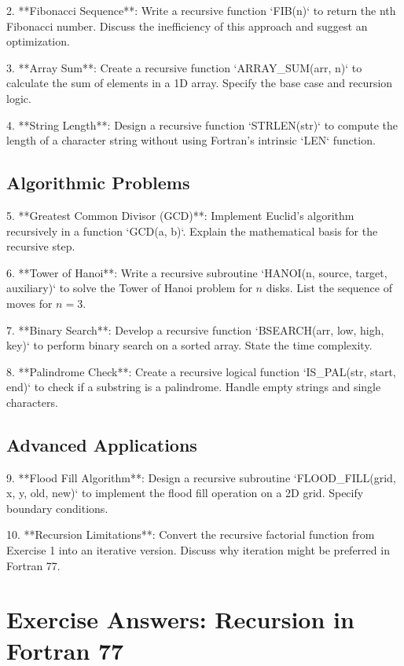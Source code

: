 \documentclass{book}
\begin{document}
2. **Fibonacci Sequence**:  
   Write a recursive function `FIB(n)` to return the nth Fibonacci number. Discuss the inefficiency of this approach and suggest an optimization.  

3. **Array Sum**:  
   Create a recursive function `ARRAY_SUM(arr, n)` to calculate the sum of elements in a 1D array. Specify the base case and recursion logic.  

4. **String Length**:  
   Design a recursive function `STRLEN(str)` to compute the length of a character string without using Fortran's intrinsic `LEN` function.  

\subsection*{Algorithmic Problems}  
5. **Greatest Common Divisor (GCD)**:  
   Implement Euclid's algorithm recursively in a function `GCD(a, b)`. Explain the mathematical basis for the recursive step.  

6. **Tower of Hanoi**:  
   Write a recursive subroutine `HANOI(n, source, target, auxiliary)` to solve the Tower of Hanoi problem for \( n \) disks. List the sequence of moves for \( n=3 \).  

7. **Binary Search**:  
   Develop a recursive function `BSEARCH(arr, low, high, key)` to perform binary search on a sorted array. State the time complexity.  

8. **Palindrome Check**:  
   Create a recursive logical function `IS_PAL(str, start, end)` to check if a substring is a palindrome. Handle empty strings and single characters.  

\subsection*{Advanced Applications}  
9. **Flood Fill Algorithm**:  
   Design a recursive subroutine `FLOOD_FILL(grid, x, y, old, new)` to implement the flood fill operation on a 2D grid. Specify boundary conditions.  

10. **Recursion Limitations**:  
    Convert the recursive factorial function from Exercise 1 into an iterative version. Discuss why iteration might be preferred in Fortran 77.  

\section{Exercise Answers: Recursion in Fortran 77}
\end{document}
